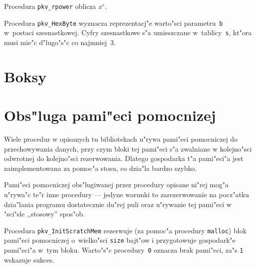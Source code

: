 \vspace{\bigskipamount}
Procedura \texttt{pkv\_rpower} oblicza $x^e$.

\vspace{\bigskipamount}
Procedura \texttt{pkv\_HexByte} wyznacza reprezentacj"e warto"sci
parametru~\texttt{b} w~postaci szesnastkowej. Cyfry szesnastkowe
s"a umieszczane w~tablicy~\texttt{s}, kt"ora musi mie"c d"lugo"s"c
co najmniej~$3$.


\section{Boksy}


\mbox{}

\section{\label{sect:scratch:mem}Obs"luga pami"eci pomocnizej}

Wiele procedur w opisanych tu bibliotekach
u"rywa pami"eci pomocniczej do przechowywania danych, przy czym
bloki tej pami"eci s"a zwalniane w kolejno"sci odwrotnej do
kolejno"sci rezerwowania. Dlatego gospodarka t"a pami"eci"a jest
zaimplementowana za pomoc"a stosu, co dzia"la bardzo szybko.

Pami"eci pomocniczej obs"lugiwanej przez procedury opisane ni"rej mog"a
u"rywa"c te"r inne procedury --- jedyne warunki to zarezerwowanie na
pocz"atku dzia"lania programu dostatecznie du"rej puli oraz u"rywanie tej
pami"eci w "sci"sle ,,stosowy'' spos"ob.

\vspace{\bigskipamount}
Procedura \texttt{pkv\_InitScratchMem} rezerwuje (za pomoc"a procedury
\texttt{malloc}) blok pami"eci pomocniczej o~wielko"sci \texttt{size}
bajt"ow i przygotowuje gospodark"e pami"eci"a w~tym bloku. Warto"s"c
procedury~\texttt{0} oznacza brak pami"eci, za"s \texttt{1} wskazuje
sukces.

